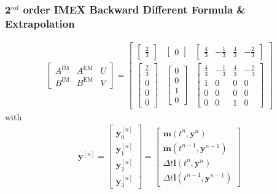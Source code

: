 \subsubsection{2$^{nd}$ order IMEX Backward Different Formula \& Extrapolation}
\begin{align*}
\left[ \begin{array}{cc|c}
A^{\mathrm{IM}} & A^{\mathrm{EM}} & U \\
\hline
B^{\mathrm{IM}} & B^{\mathrm{EM}} & V
\end{array} \right ] =
\left[\begin{array}{cc|c}
\left [ \begin{array}{c} \frac{2}{3} \end{array} \right ] & \left [ \begin{array}{c} 0 \end{array} \right ] &
\left [ \begin{array}{cccc} \frac{4}{3} & -\frac{1}{3} & \frac{4}{3} &  -\frac{2}{3} \end{array} \right ] \\
\hline
\left [ \begin{array}{c} \frac{2}{3} \\ 0 \\ 0 \\ 0 \end{array} \right ] & \left [ \begin{array}{c} 0 \\0 \\ 1 \\ 0 \end{array} \right ]&
\left [ \begin{array}{cccc} \frac{4}{3} & -\frac{1}{3} & \frac{4}{3} & -\frac{2}{3} \\ 1 & 0 & 0 & 0 \\ 0 & 0 & 0 & 0\\ 0 & 0 & 1 & 0 \end{array} \right ]
\end{array}\right]
\end{align*}
with
\begin{align*}
\boldsymbol{y}^{[n]}=
\left[\begin{array}{c}
\boldsymbol{y}^{[n]}_0\\
\boldsymbol{y}^{[n]}_1 \\
\boldsymbol{y}^{[n]}_2 \\
\boldsymbol{y}^{[n]}_3
\end{array}\right]=
\left[\begin{array}{l}
\boldsymbol{m}\left(t^n,\boldsymbol{y}^{n}\right)\\
\boldsymbol{m}\left(t^{n-1},\boldsymbol{y}^{n-1}\right)\\
\Delta t \boldsymbol{l}\left ( t^n, \boldsymbol{y}^{n}\right)\\
\Delta t \boldsymbol{l}\left ( t^{n-1}, \boldsymbol{y}^{n-1}\right)
\end{array}\right]
\end{align*}

